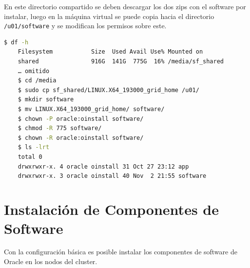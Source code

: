 \documentclass{article}
\begin{document}
En este directorio compartido se deben descargar los dos zips con el software por instalar, luego en la máquina virtual se puede copia hacia el directorio \texttt{/u01/software} y se modifican los permisos sobre este.

\begin{lstlisting}[style=mystyle,language=bash]
	$ df -h 
	Filesystem           Size  Used Avail Use% Mounted on
	shared               916G  141G  775G  16% /media/sf_shared
	… omitido
	$ cd /media
	$ sudo cp sf_shared/LINUX.X64_193000_grid_home /u01/
	$ mkdir software
	$ mv LINUX.X64_193000_grid_home/ software/
	$ chown -P oracle:oinstall software/
	$ chmod -R 775 software/ 
	$ chown -R oracle:oinstall software/
	$ ls -lrt 
	total 0
	drwxrwxr-x. 4 oracle oinstall 31 Oct 27 23:12 app
	drwxrwxr-x. 3 oracle oinstall 40 Nov  2 21:55 software
\end{lstlisting}

\section{Instalación de Componentes de Software}

Con la configuración básica es posible instalar los componentes de software de Oracle en los nodos del cluster.
\end{document}

